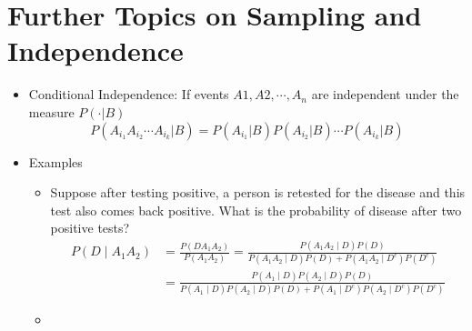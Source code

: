 \documentclass{report}
\begin{document}
\section{Further Topics on Sampling and Independence}
  \begin{itemize}
    \item Conditional Independence: If events $A1,A2, \cdots , A_n$ are independent under the measure $P( \cdot | B)$
      \[ P(A_i_1 A_i_2 \cdots A_i_k | B) = P(A_i_1 | B) P(A_i_2 | B) \cdots P(A_i_k | B) \]
    \item Examples
      \begin{itemize}
        \item Suppose after testing positive, a person is retested for the disease
and this test also comes back positive. What is the probability of disease after two
positive tests?
          \[
            \begin{aligned}
            P\left(D \mid A_1 A_2\right) & =\frac{P\left(D A_1 A_2\right)}{P\left(A_1 A_2\right)}=\frac{P\left(A_1 A_2 \mid D\right) P(D)}{P\left(A_1 A_2 \mid D\right) P(D)+P\left(A_1 A_2 \mid D^c\right) P\left(D^c\right)} \\
            & =\frac{P\left(A_1 \mid D\right) P\left(A_2 \mid D\right) P(D)}{P\left(A_1 \mid D\right) P\left(A_2 \mid D\right) P(D)+P\left(A_1 \mid D^c\right) P\left(A_2 \mid D^c\right) P\left(D^c\right)}
            \end{aligned}
          \]
        \item 
      \end{itemize}
  \end{itemize}
\end{document}
